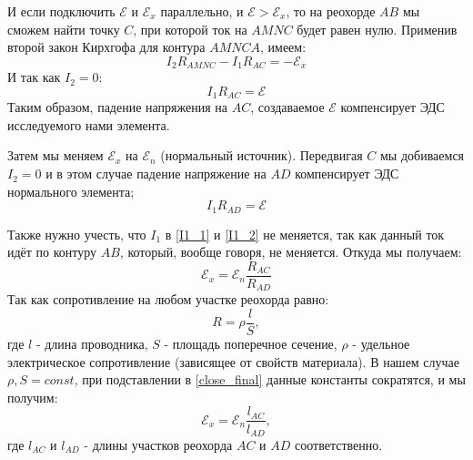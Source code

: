 \documentclass[a4paper,12pt]{article}
\begin{document}
И если подключить $\mathcal{E}$ и  $\mathcal{E}_x$ параллельно, и $\mathcal{E} > \mathcal{E}_x$, то на реохорде $AB$ мы сможем найти точку $C$, при которой ток на $AMNC$ будет равен нулю. 
Применив второй закон Кирхгофа для контура $AMNCA$, имеем:
\begin{equation}\label{Kirchhoff}
	I_2R_{AMNC} - I_1R_{AC} = -\mathcal{E}_x
\end{equation}
И так как $I_2 = 0$:
\begin{equation}\label{I1_1}
	I_1R_{AC} = \mathcal{E}
\end{equation}
Таким образом, падение напряжения на $AC$, создаваемое $\mathcal{E}$ компенсирует ЭДС исследуемого нами элемента.

Затем мы меняем $\mathcal{E}_x$ на $\mathcal{E}_n$ (нормальный источник). Передвигая $C$ мы добиваемся $I_2 = 0$ и в этом случае падение напряжение на $AD$ компенсирует ЭДС нормального элемента;
\begin{equation}\label{I1_2}
	I_1R_{AD} = \mathcal{E}
\end{equation}

Также нужно учесть, что $I_1$ в \eqref{I1_1} и \eqref{I1_2} не меняется, так как данный ток идёт по контуру $AB$, который, вообще говоря, не меняется. Откуда мы получаем:
\begin{equation}\label{close_final}
	\mathcal{E}_x = \mathcal{E}_n\frac{R_{AC}}{R_{AD}} 
\end{equation}
Так как сопротивление на любом участке реохорда равно:
$$ R = \rho \frac{l}{S},$$
где $l$ - длина проводника, $S$ - площадь поперечное сечение, $\rho$ - удельное электрическое сопротивление (зависящее от свойств материала).
В нашем случае $\rho, S = const$, при подставлении в \eqref{close_final} данные константы сократятся, и мы получим:
\begin{equation}
	\mathcal{E}_x = \mathcal{E}_n\frac{l_{AC}}{l_{AD}},
\end{equation}
где $l_{AC}$ и $l_{AD}$ - длины участков реохорда $AC$ и $AD$ соответственно.

\newpage
\end{document}
